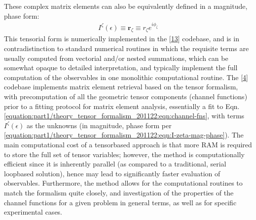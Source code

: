 \documentclass[letterpaper,table,10pt,english]{jupyterBook}
\begin{document}
\sphinxAtStartPar
These complex matrix elements can also be equivalently defined in a magnitude, phase
form:
\begin{equation}\label{equation:part1/theory_tensor_formalism_201122:eqn:I-zeta-mag-phase}
\begin{split}I^{\zeta}(\epsilon)\equiv\mathbf{r}_{\zeta}\equiv r_{\zeta}e^{i\phi_{\zeta}}\end{split}
\end{equation}
\sphinxAtStartPar
This tensorial form is numerically implemented in the  {[}\hyperlink{cite.backmatter/bibliography:id547}{13}{]} codebase, and is in contradistinction to standard numerical routines in which the requisite terms are usually computed from vectorial and/or nested summations, which can be somewhat opaque to
detailed interpretation, and typically implement the full computation of the observables in one monolithic computational routine. The  {[}\hyperlink{cite.backmatter/bibliography:id618}{4}{]} codebase implements matrix element retrieval based on the tensor formalism, with pre\sphinxhyphen{}computation of all the geometric tensor components (channel functions) prior to a fitting protocol for matrix element analysis, essentially a fit to Eqn. \eqref{equation:part1/theory_tensor_formalism_201122:eqn:channel-fns}, with terms \(I^{\zeta}(\epsilon)\) as the unknowns (in magnitude, phase form per \eqref{equation:part1/theory_tensor_formalism_201122:eqn:I-zeta-mag-phase}). The main computational cost of a tensor\sphinxhyphen{}based approach is that more RAM is required to store the full set of tensor variables; however, the method is computationally efficient since it is inherently parallel (as compared to a traditional, serial loop\sphinxhyphen{}based solution), hence may lead to significantly faster evaluation of observables. Furthermore, the method allows for the computational routines to match the formalism quite closely, and investigation of the properties of the channel functions for a given problem in general terms, as well as for specific experimental cases.
\end{document}

